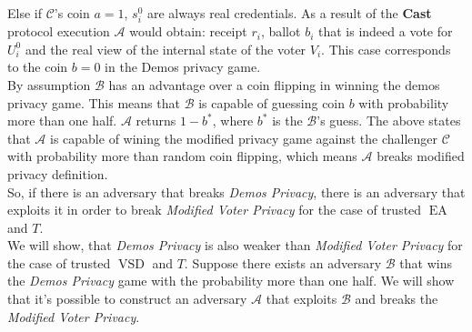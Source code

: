 \documentclass[12pt]{article}
\DeclareMathOperator{\vsd}{VSD}
\DeclareMathOperator{\ea}{EA}
\begin{document}
 Else if $\mathcal{C}$'s coin $a=1$, $s^0_i$ are always real credentials. As a result of the \textbf{Cast}  protocol execution $\mathcal{A}$ would obtain: receipt $r_i$, ballot $b_i$ that is indeed a vote for $U^0_i$  and the real view of the internal state of the voter $V_i$. This case corresponds to the coin $b=0$ in the Demos privacy game.\\
 
By assumption $\mathcal{B}$ has an advantage over a coin flipping in winning the demos privacy game. This means that  $\mathcal{B}$ is capable of guessing coin $b$ with probability more than one half.  $\mathcal{A}$ returns $1-b^*$, where $b^*$ is the $\mathcal{B}$'s guess. The above states that $\mathcal{A}$ is capable of wining the modified privacy game against  the challenger $\mathcal{C}$ with probability more than random coin flipping, which means $\mathcal{A}$ breaks modified privacy definition. \\

So, if there is an adversary that breaks \textit{Demos Privacy}, there is an adversary that exploits it in order to  break \textit{Modified Voter Privacy} for the case of trusted $\ea$ and $T$. \\

We will show, that \textit{Demos Privacy} is also weaker than  \textit{Modified Voter Privacy} for the case of trusted $\vsd$ and $T$. Suppose there exists an adversary $\mathcal{B}$ that wins the \textit{Demos Privacy} game with the probability more than one half. We will show that it's possible to construct an adversary $\mathcal{A}$ that exploits $\mathcal{B}$ and breaks the \textit{Modified Voter Privacy}.\\
\end{document}

